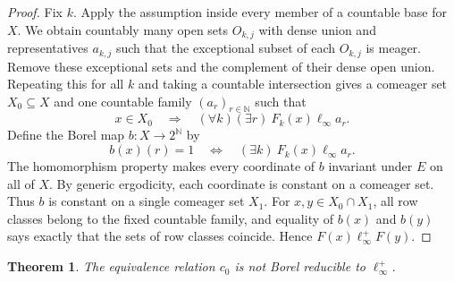 \documentclass[11pt]{article}
\numberwithin{equation}{section}
\newtheorem{theorem}{Theorem}[section]
\theoremstyle{definition}
\begin{document}
\begin{proof}
Fix $k$. Apply the assumption inside every member of a countable base for
$X$. We obtain countably many open sets $O_{k,j}$ with dense union and
representatives $a_{k,j}$ such that the exceptional subset of each
$O_{k,j}$ is meager. Remove these exceptional sets and the complement of
their dense open union. Repeating this for all $k$ and taking a countable
intersection gives a comeager set $X_0\subseteq X$ and one countable
family $(a_r)_{r\in\mathbb N}$ such that
\[
  x\in X_0\quad\Longrightarrow\quad
  (\forall k)(\exists r)\ F_k(x)\mathrel{\ell_\infty}a_r.
\]
Define the Borel map $b:X\to2^{\mathbb N}$ by
\[
  b(x)(r)=1\quad\Longleftrightarrow\quad
  (\exists k)\ F_k(x)\mathrel{\ell_\infty}a_r.
\]
The homomorphism property makes every coordinate of $b$ invariant under
$E$ on all of $X$. By generic ergodicity, each coordinate is constant on
a comeager set. Thus $b$ is constant on a single comeager set $X_1$.
For $x,y\in X_0\cap X_1$, all row classes belong to the fixed countable
family, and equality of $b(x)$ and $b(y)$ says exactly that the sets of
row classes coincide. Hence $F(x)\mathrel{\ell_\infty^+}F(y)$.
\end{proof}

\begin{theorem}
\label{thm:c0-jump}
The equivalence relation $c_0$ is not Borel reducible to
$\ell_\infty^+$.
\end{theorem}
\end{document}
